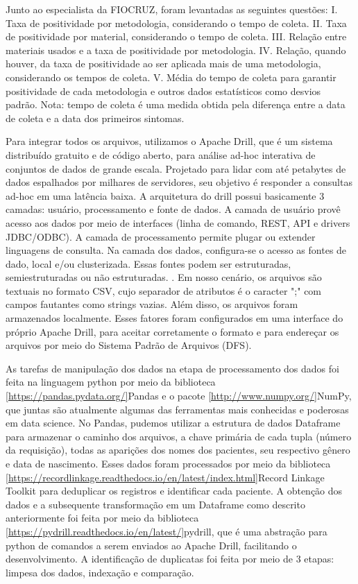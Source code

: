 Junto ao especialista da FIOCRUZ, foram levantadas as seguintes questões:
I.	Taxa de positividade por metodologia, considerando o tempo de coleta.
II.	Taxa de positividade por material, considerando o tempo de coleta.
III.	Relação entre materiais usados e a taxa de positividade por metodologia.
IV.	Relação, quando houver, da taxa de positividade ao ser aplicada mais de uma metodologia, considerando os tempos de coleta.
V.	Média do tempo de coleta para garantir positividade de cada metodologia e outros dados estatísticos como desvios padrão.
Nota: tempo de coleta é uma medida obtida pela diferença entre a data de coleta e a data dos primeiros sintomas.

Para integrar todos os arquivos, utilizamos o Apache Drill, que é um sistema distribuído gratuito e de código aberto, para análise ad-hoc interativa de conjuntos de dados de grande escala. Projetado para lidar com até
petabytes de dados espalhados por milhares de servidores, seu objetivo é responder a consultas ad-hoc em uma latência baixa.
A arquitetura do drill possui basicamente 3 camadas: usuário, processamento e fonte de dados.
A camada de usuário provê acesso aos dados por meio de interfaces (linha de comando, REST, API e drivers JDBC/ODBC). A camada de processamento permite plugar ou extender linguagens de consulta. Na camada dos dados, configura-se  o acesso as fontes de dado, local e/ou clusterizada. Essas fontes podem ser estruturadas, semiestruturadas ou não estruturadas. \cite{hausenblas2013apache}.
Em nosso cenário, os arquivos são textuais no formato CSV, cujo separador de atributos é o caracter ";" com campos fautantes como strings vazias. Além disso, os arquivos foram armazenados localmente. Esses fatores foram configurados em uma interface do próprio Apache Drill, para aceitar corretamente o formato e para endereçar os arquivos por meio do Sistema Padrão de Arquivos (DFS).

As tarefas de manipulação dos dados na etapa de processamento dos dados foi feita na linguagem python por meio da biblioteca \ref{https://pandas.pydata.org/}{Pandas} e o pacote \ref{http://www.numpy.org/}{NumPy}, que juntas são atualmente algumas das ferramentas mais conhecidas e poderosas em data science.
No Pandas, pudemos utilizar a estrutura de dados Dataframe para armazenar o caminho dos arquivos, a chave primária de cada tupla (número da requisição), todas as aparições dos nomes dos pacientes, seu respectivo gênero e data de nascimento. Esses dados foram processados por meio da biblioteca \ref{https://recordlinkage.readthedocs.io/en/latest/index.html}{Record Linkage Toolkit} para deduplicar os registros e identificar cada paciente.
A obtenção dos dados e a subsequente transformação em um Dataframe como descrito anteriormente foi feita por meio da biblioteca \ref{https://pydrill.readthedocs.io/en/latest/}{pydrill}, que é uma abstração para python de comandos a serem enviados ao Apache Drill, facilitando o desenvolvimento.
A identificação de duplicatas foi feita por meio de 3 etapas: limpesa dos dados, indexação e comparação.

